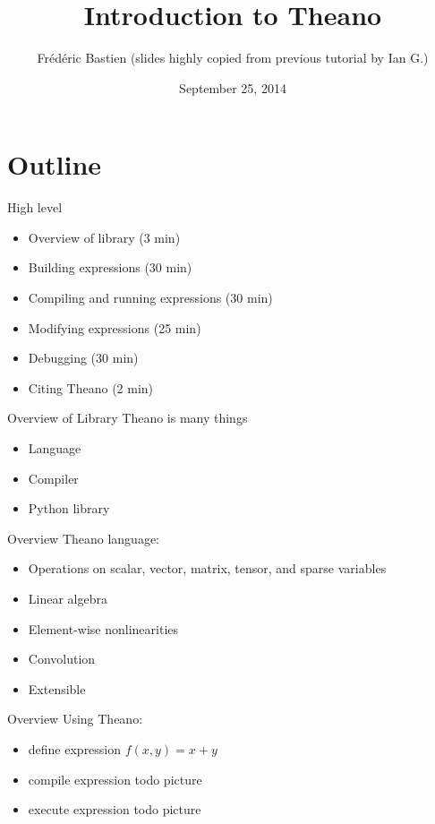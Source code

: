 \documentclass[utf8x,xcolor=pdftex,dvipsnames,table]{beamer}
\title{Introduction to Theano}
\author{%
\footnotesize
Frédéric Bastien \newline
(slides highly copied from previous tutorial by Ian G.) \newline
}
\date{September 25, 2014}
\begin{document}
\begin{frame}[plain]
 \titlepage
 \vspace{-5em}
 \hfill
\end{frame}

\section{Outline}
\begin{frame}{High level}\setcounter{page}{1}
  \begin{itemize}
  \item Overview of library (3 min)
  \item Building expressions (30 min)
  \item Compiling and running expressions (30 min)
  \item Modifying expressions (25 min)
  \item Debugging (30 min)
  \item Citing Theano (2 min)
  \end{itemize}
\end{frame}


\begin{frame}{Overview of Library}
  Theano is many things
  \begin{itemize}
  \item Language
  \item Compiler
  \item Python library
  \end{itemize}
\end{frame}

\begin{frame}{Overview}
  Theano language:
  \begin{itemize}
  \item Operations on scalar, vector, matrix, tensor, and sparse variables
  \item Linear algebra
  \item Element-wise nonlinearities
  \item Convolution
  \item Extensible
  \end{itemize}
\end{frame}

\begin{frame}{Overview}
  Using Theano:
  \begin{itemize}
  \item define expression $f(x,y) = x + y$
  \item compile expression todo picture
  \item execute expression todo picture
  \end{itemize}
\end{frame}
\end{document}

